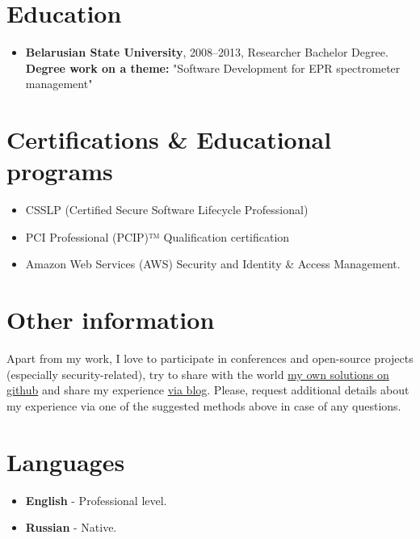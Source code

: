\documentclass[a4paper, 12pt]{article}
\newcommand{\position}[1]{
    \textbf{#1}}
\begin{document}
\section*{Education}

    \begin{itemize}

        \item \position{Belarusian State University}, 2008--2013, Researcher Bachelor Degree.
            \newline\textbf{Degree work on a theme:} 
            \newline "Software Development for EPR spectrometer management"
    \end{itemize}
    

\section*{Certifications \& Educational programs}

    \begin{itemize}
        \item CSSLP (Certified Secure Software Lifecycle Professional)
        \item PCI Professional (PCIP)™ Qualification certification
        \item Amazon Web Services (AWS) Security and Identity \& Access Management.
    \end{itemize}
    

\section*{Other information}  
Apart from my work, I love to participate in conferences and open-source projects (especially security-related), try to share with the world \href{https://github.com/EasyAppSecurity}{my own solutions on github} and share my experience \href{https://mikhailrusakovich.wordpress.com/}{via blog}. Please, request additional details about my experience via one of the suggested methods above in case of any questions.


    
\section*{Languages}
 	\begin{itemize}
 		 \item \position{English} - Professional level.
 		 \item \position{Russian} - Native.

 	\end{itemize}    
    
\end{document}
